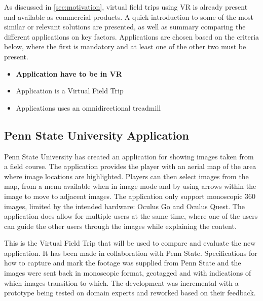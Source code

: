     
    As discussed in \cref{sec:motivation}, virtual field trips using VR is already present and available as commercial products. A quick introduction to some of the most similar or relevant solutions are presented, as well as summary comparing the different applications on key factors. Applications are chosen based on the criteria below, where the first is mandatory and at least one of the other two must be present.
    
    \begin{itemize}
        \item \textbf{Application have to be in VR}
        
        \item Application is a Virtual Field Trip
        
        \item Applications uses an omnidirectional treadmill
    \end{itemize}
    
    \subsection{Penn State University Application}
        Penn State University has created an application for showing images taken from a field course. The application provides the player with an aerial map of the area where image locations are highlighted. Players can then select images from the map, from a menu available when in image mode and by using arrows within the image to move to adjacent images. The application only support monoscopic 360 images, limited by the intended hardware: Oculus Go and Oculus Quest. The application does allow for multiple users at the same time, where one of the users can guide the other users through the images while explaining the content.
        
        This is the Virtual Field Trip that will be used to compare and evaluate the new application. It has been made in collaboration with Penn State. Specifications for how to capture and mark the footage was supplied from Penn State and the images were sent back in monoscopic format, geotagged and with indications of which images transition to which. The development was incremental with a prototype being tested on domain experts and reworked based on their feedback.
    
